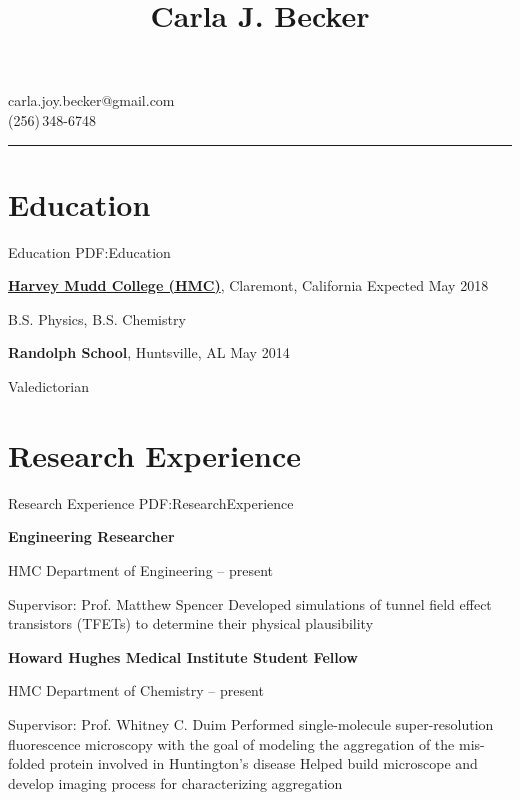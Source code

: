 \documentclass[letterpaper,10pt,oneside]{article}
\newcommand{\CVAuthor}{Carla J. Becker}
\begin{document}

\title{\CVAuthor}

\begin{subtitle}
carla.joy.becker@gmail.com
\\
(256)\,348-6748
\end{subtitle}
\vspace{2mm}
\hrule
\begin{body}


\section
{Education}
{Education}
{PDF:Education}

\href{https://www.hmc.edu/}
{\textbf{Harvey Mudd College (HMC)}},
Claremont, California
\hfill
Expected May 2018

\GapNoBreak
\BulletItem
B.S. Physics, B.S. Chemistry

\Gap
{\textbf{Randolph School}},
Huntsville, AL
\hfill
May 2014

\GapNoBreak
\BulletItem
Valedictorian


\section
{Research Experience}
{Research Experience}
{PDF:ResearchExperience}

{\textbf{Engineering Researcher}}

\GapNoBreak
\BulletItem
HMC Department of Engineering
\hfill
{} --
present
\begin{detail}
\SubBulletItem
Supervisor:
Prof. Matthew Spencer
\SubBulletItemBullet
Developed simulations of tunnel field effect transistors (TFETs) to determine their physical plausibility
\end{detail}

\BigGap

{\textbf{Howard Hughes Medical Institute Student Fellow}}

\GapNoBreak
\BulletItem
HMC Department of Chemistry
\hfill
{} --
present
\begin{detail}
\SubBulletItem
Supervisor:
Prof. Whitney C. Duim
\SubBulletItemBullet
Performed single-molecule super-resolution fluorescence microscopy with the goal of modeling the aggregation of the mis-folded protein involved in	Huntington's disease
\SubBulletItemBullet
Helped build microscope and develop imaging process for 			characterizing aggregation
\end{detail}


\end{body}
\end{document}
